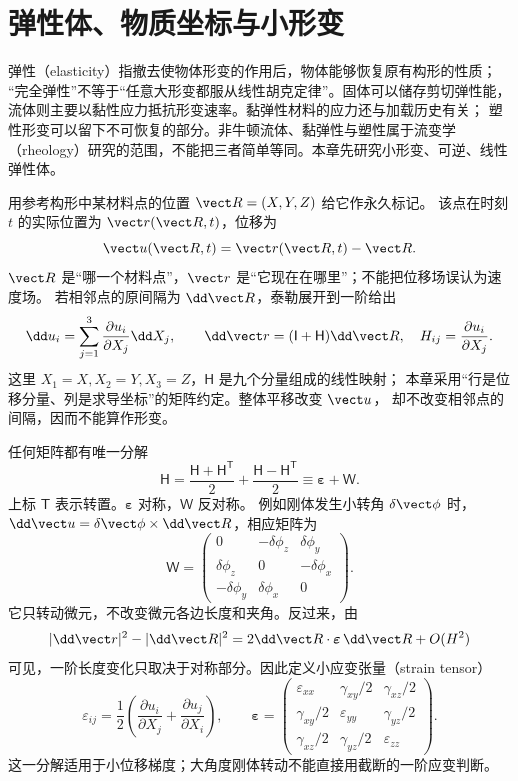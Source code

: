 \section{弹性体、物质坐标与小形变}

弹性（elasticity）指撤去使物体形变的作用后，物体能够恢复原有构形的性质；
“完全弹性”不等于“任意大形变都服从线性胡克定律”。固体可以储存剪切弹性能，
流体则主要以黏性应力抵抗形变速率。黏弹性材料的应力还与加载历史有关；
塑性形变可以留下不可恢复的部分。非牛顿流体、黏弹性与塑性属于流变学
（rheology）研究的范围，不能把三者简单等同。本章先研究小形变、可逆、线性弹性体。

用参考构形中某材料点的位置 $\vect R=(X,Y,Z)$ 给它作永久标记。
该点在时刻 $t$ 的实际位置为 $\vect r(\vect R,t)$，位移为
\begin{equation}
 \vect u(\vect R,t)=\vect r(\vect R,t)-\vect R.
 \label{ch12:eq:displacement}
\end{equation}
$\vect R$ 是“哪一个材料点”，$\vect r$ 是“它现在在哪里”；不能把位移场误认为速度场。
若相邻点的原间隔为 $\dd\vect R$，泰勒展开到一阶给出
\begin{equation}
 \dd u_i=\sum_{j=1}^{3}\frac{\partial u_i}{\partial X_j}\dd X_j,\qquad
 \dd\vect r=(\mathsf I+\mathsf H)\dd\vect R,\quad H_{ij}=\frac{\partial u_i}{\partial X_j}.
 \label{ch12:eq:gradient}
\end{equation}
这里 $X_1=X,X_2=Y,X_3=Z$，$\mathsf H$ 是九个分量组成的线性映射；
本章采用“行是位移分量、列是求导坐标”的矩阵约定。整体平移改变 $\vect u$，
却不改变相邻点的间隔，因而不能算作形变。

任何矩阵都有唯一分解
\[
 \mathsf H=\frac{\mathsf H+\mathsf H^{\mathsf T}}2+
            \frac{\mathsf H-\mathsf H^{\mathsf T}}2
          \equiv\boldsymbol\varepsilon+\mathsf W.
\]
上标 $\mathsf T$ 表示转置。$\boldsymbol\varepsilon$ 对称，$\mathsf W$ 反对称。
例如刚体发生小转角 $\delta\vect\phi$ 时，
$\dd\vect u=\delta\vect\phi\times\dd\vect R$，相应矩阵为
\[
 \mathsf W=
 \begin{pmatrix}
 0&-\delta\phi_z&\delta\phi_y\\
 \delta\phi_z&0&-\delta\phi_x\\
 -\delta\phi_y&\delta\phi_x&0
 \end{pmatrix}.
\]
它只转动微元，不改变微元各边长度和夹角。反过来，由
\[
 |\dd\vect r|^2-|\dd\vect R|^2
 =2\dd\vect R\cdot\boldsymbol\varepsilon\,\dd\vect R+O(H^2)
\]
可见，一阶长度变化只取决于对称部分。因此定义小应变张量（strain tensor）
\begin{equation}
 \varepsilon_{ij}=\frac12\left(\frac{\partial u_i}{\partial X_j}
                           +\frac{\partial u_j}{\partial X_i}\right),\qquad
 \boldsymbol\varepsilon=
 \begin{pmatrix}
 \varepsilon_{xx}&\gamma_{xy}/2&\gamma_{xz}/2\\
 \gamma_{xy}/2&\varepsilon_{yy}&\gamma_{yz}/2\\
 \gamma_{xz}/2&\gamma_{yz}/2&\varepsilon_{zz}
 \end{pmatrix}.
 \label{ch12:eq:strain}
\end{equation}
这一分解适用于小位移梯度；大角度刚体转动不能直接用截断的一阶应变判断。

